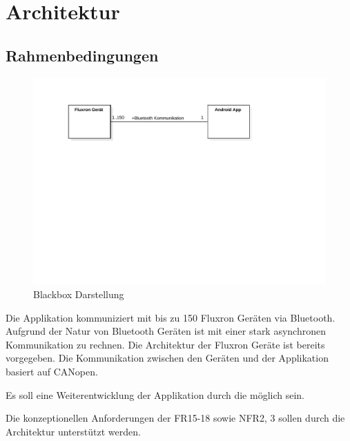 \section{Architektur}
\label{sec:Architektur}

\subsection{Rahmenbedingungen}
\begin{figure}[H]
    \begin{center}
        \includegraphics[trim=30 420 140 60,clip,width=\textwidth]{design/res/blackbox}
    \end{center}
    \caption{Blackbox Darstellung}
\end{figure}

Die Applikation kommuniziert mit bis zu 150 Fluxron Geräten via Bluetooth. Aufgrund der Natur von Bluetooth Geräten ist mit einer stark asynchronen Kommunikation zu rechnen. Die Architektur der Fluxron Geräte ist bereits vorgegeben. Die Kommunikation  zwischen den Geräten und der Applikation basiert auf CANopen.

Es soll eine Weiterentwicklung der Applikation durch die \fluxron{} möglich sein.

Die konzeptionellen Anforderungen der \ac{FR}15-18 sowie \ac{NFR}2, 3 sollen durch die Architektur unterstützt werden.

